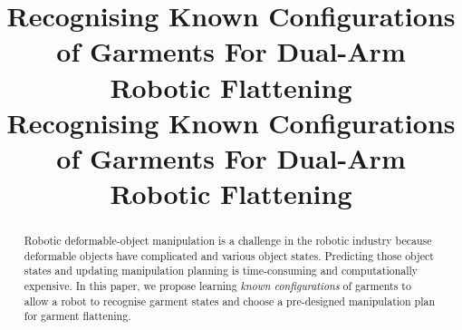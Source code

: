\documentclass[conference]{IEEEtran}
\begin{document}
\title{Recognising Known Configurations of Garments For Dual-Arm Robotic Flattening\\
}

\author{
\and
{}
}

\maketitle

\title{Recognising Known Configurations of Garments For Dual-Arm Robotic Flattening\\
}

\author{
\and
{}
}

\maketitle

\begin{abstract}
Robotic deformable-object manipulation is a challenge in the robotic industry because deformable objects have complicated and various object states. Predicting those object states and updating manipulation planning is time-consuming and computationally expensive. In this paper, we propose learning \textit{known configurations} of garments to allow a robot to recognise garment states and choose a pre-designed manipulation plan for garment flattening.
\end{abstract}
\end{document}

